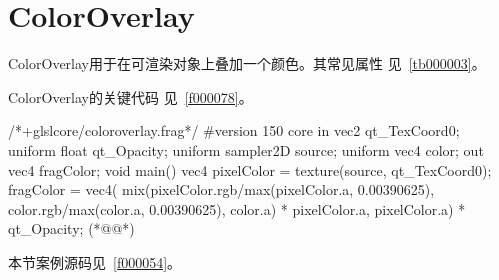 ﻿




\FloatBarrier
\section{
ColorOverlay
}\label{c000015s000004}


ColorOverlay用于在可渲染对象上叠加一个颜色。其常见属性
见\tablename\ \ref{tb000003}。






ColorOverlay的关键代码
见\filesourcenumbernameone\ \ref{f000078}。
\label{f000078}    %
\FloatBarrier                                  %
\begin{thebookfilesourceone}[escapeinside={(*@}{@*)},
caption=GoodLuck,
title=\filesourcenumbernameone \thefilesourcenumber
]
/*+glslcore/coloroverlay.frag*/
#version 150 core
in vec2 qt_TexCoord0;
uniform float qt_Opacity;
uniform sampler2D source;
uniform vec4 color;
out vec4 fragColor;
void main() {
    vec4 pixelColor = texture(source, qt_TexCoord0);
    fragColor = vec4(
        mix(pixelColor.rgb/max(pixelColor.a, 0.00390625),
            color.rgb/max(color.a, 0.00390625),
            color.a) * pixelColor.a,
        pixelColor.a) * qt_Opacity;
}(*@\marginpar[\hfill\setlength\fboxsep{2pt}\fbox{\footnotesize{\kaishu\parbox{1em}{\setlength{\baselineskip}{2pt}\filesourcenumbernameone}}\footnotesize{\thefilesourcenumber}}]{\setlength\fboxsep{2pt}\fbox{\footnotesize{\kaishu\parbox{1em}{\setlength{\baselineskip}{2pt}\filesourcenumbernameone}}\footnotesize{\thefilesourcenumber}}}@*)\end{thebookfilesourceone}          %
\addtocounter{lstlisting}{-1}   %


本节案例源码见\filesourcenumbernameone\ \ref{f000054}。


